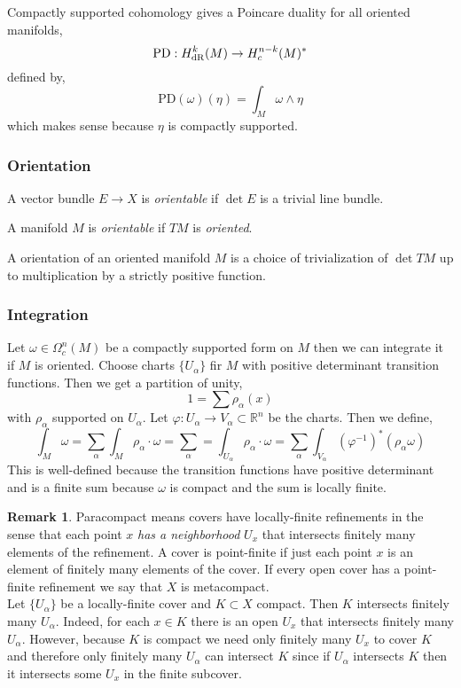 \documentclass[12pt]{extarticle}
\newcommand{\R}{\mathbb{R}}
\theoremstyle{definition}
\newtheorem{remark}{Remark}
\newenvironment{definition}[1][Definition:]{\begin{trivlist}
\item[\hskip \labelsep {\bfseries #1}]}{\end{trivlist}}
\begin{document}
Compactly supported cohomology gives a Poincare duality for all oriented manifolds,
\[ \mathrm{PD} : H^k_{\mathrm{dR}}(M) \to H^{n-k}_c(M)^* \]
defined by,
\[ \mathrm{PD}(\omega)(\eta) = \int_M \omega \wedge \eta \]
which makes sense because $\eta$ is compactly supported. 

\subsubsection{Orientation}

\begin{definition}
A vector bundle $E \to X$ is \textit{orientable} if $\det{E}$ is a trivial line bundle.
\end{definition}

\begin{definition}
A manifold $M$ is \textit{orientable} if $TM$ is \textit{oriented}.
\end{definition}

\begin{definition}
A orientation of an oriented manifold $M$ is a choice of trivialization of $\det{TM}$ up to multiplication by a strictly positive function. 
\end{definition}

\subsubsection{Integration}

Let $\omega \in \Omega^n_c(M)$ be a compactly supported form on $M$ then we can integrate it if $M$ is oriented. Choose charts $\{ U_\alpha \}$ fir $M$ with positive determinant transition functions. Then we get a partition of unity,
\[ 1 = \sum \rho_\alpha(x) \]
with $\rho_\alpha$ supported on $U_\alpha$. Let $\varphi : U_\alpha \to V_\alpha \subset \R^n$ be the charts. Then we define,
\[ \int_M \omega = \sum_\alpha \int_M \rho_\alpha \cdot \omega = \sum_\alpha = \int_{U_\alpha} \rho_\alpha \cdot \omega = \sum_\alpha \int_{V_\alpha} (\varphi^{-1})^* (\rho_\alpha \omega) \]
This is well-defined because the transition functions have positive determinant and is a finite sum because $\omega$ is compact and the sum is locally finite. 

\begin{remark}
Paracompact means covers have locally-finite refinements in the sense that each point $x$ \textit{has a neighborhood} $U_x$ that intersects finitely many elements of the refinement. A cover is point-finite if just each point $x$ is an element of finitely many elements of the cover. If every open cover has a point-finite refinement we say that $X$ is metacompact. 
\bigskip\\
Let $\{ U_\alpha \}$ be a locally-finite cover and $K \subset X$ compact. Then $K$ intersects finitely many $U_\alpha$. Indeed, for each $x \in K$ there is an open $U_x$ that intersects finitely many $U_\alpha$. However, because $K$ is compact we need only finitely many $U_x$ to cover $K$ and therefore only finitely many $U_\alpha$ can intersect $K$ since if $U_\alpha$ intersects $K$ then it intersects some $U_x$ in the finite subcover. 
\end{remark}
\end{document}
